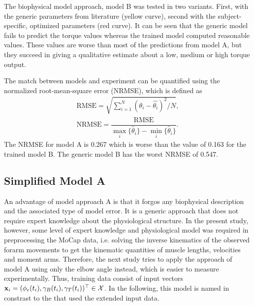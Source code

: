The biophysical model approach, model B was tested in two variants. First, with the generic parameters from literature (yellow curve), second with the subject-specific, optimized parameters (red curve). It can be seen that the generic model fails to predict the torque values whereas the trained model computed reasonable values. These values are worse than most of the predictions from model A, but they succeed in giving a qualitative estimate about a low, medium or high torque output.

The match between models and experiment can be quantified using the normalized root-mean-square error (NRMSE), which is defined as
\begin{equation*}
  \begin{array}{lll}
    \text{RMSE} = \sqrt{\sum\limits_{i=1}^N (\theta_i - \hat{\theta_i})^2 / N},\\[4mm]
    \text{NRMSE} = \dfrac{\text{RMSE}}{\max\limits_i\{\hat\theta_i\} - \min\limits_i\{\hat\theta_i\}}.
  \end{array}
\end{equation*}
The NRMSE for model A is 0.267 which is worse than the value of 0.163 for the trained model B. The generic model B has the worst NRMSE of 0.547.

\subsection{Simplified Model A}\label{sec:res_simplified_a}
An advantage of model approach A is that it forgos any biophysical description and the associated type of model error. It is a generic approach that does not require expert knowledge about the physiological structure. In the present study, however, some level of expert knowledge and physiological model was required in preprocessing the MoCap data, i.e. solving the inverse kinematics of the observed forarm movements to get the kinematic quantities of muscle lengths, velocities and moment arms. Therefore, the next study tries to apply the approach of model A using only the elbow angle instead, which is easier to measure experimentally. Thus, training data consist of input vectors $\textbf{x}_i = (\phi_e(t_i), \gamma_B(t_i), \gamma_T(t_i))^\top \in \mathcal{X}$. In the following, this model is named  in constrast to the  that used the extended input data.

